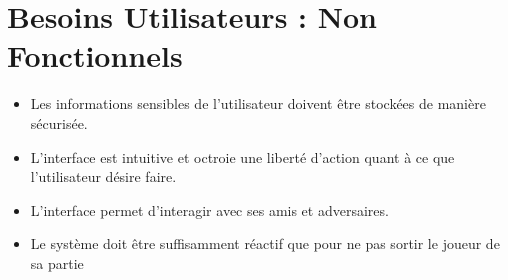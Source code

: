 \section{Besoins Utilisateurs : Non Fonctionnels}
\begin{itemize}
	\item Les informations sensibles de l'utilisateur doivent être stockées de manière sécurisée.
	\item L'interface est intuitive et octroie une liberté d'action quant à ce que l'utilisateur désire faire.
	\item L'interface permet d'interagir avec ses amis et adversaires.
	\item Le système doit être suffisamment réactif que pour ne pas sortir le joueur de sa partie
\end{itemize}
